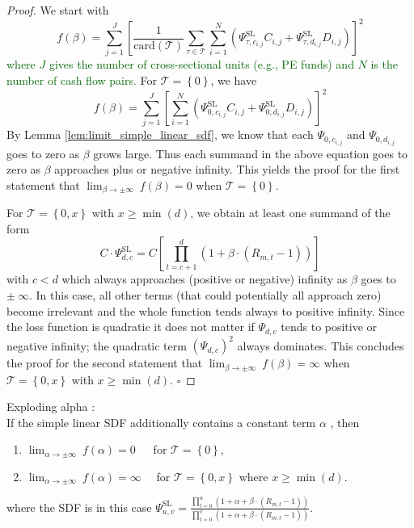 \begin{proof}
	We start with
	\[
	f(\beta) = \sum_{j=1}^J \left[
	\frac{1}{\mathrm{card}(\mathcal{T})} \sum_{\tau \in \mathcal{T}} 
	\sum_{i=1}^N \left( \Psi_{\tau, c_{i,j}}^{\mathrm{SL}} C_{i,j} + \Psi_{\tau,d_{i,j}}^{\mathrm{SL}} D_{i,j} \right)
	\right]^2
	\]
	\textcolor{darkgreen}{where $J$ gives the number of cross-sectional units (e.g., PE funds) and $N$ is the number of cash flow pairs.}
	For $\mathcal{T} = \left\{ 0 \right\}$, we have
	\[
	f(\beta) = 
	\sum_{j=1}^J \left[
	\sum_{i=1}^N \left( \Psi_{0, c_{i,j}}^{\mathrm{SL}} C_{i,j} + \Psi_{0,d_{i,j}}^{\mathrm{SL}} D_{i,j} \right)
	\right]^2
	\]
	By Lemma \ref{lem:limit_simple_linear_sdf}, we know that each $\Psi_{0, c_{i,j}}$ and $\Psi_{0, d_{i,j}}$ goes to zero as $\beta$ grows large.
	Thus each summand in the above equation goes to zero as $\beta$ approaches plus or negative infinity.
	This yields the proof for the first statement that $\lim_{\beta \to \pm \infty} \ f(\beta) = 0$ when $\mathcal{T} = \left\{ 0 \right\}$.
	
	For $\mathcal{T} = \left\{ 0, x \right\}$ with $x \geq \min (d)$, we obtain at least one summand of the form
	\[
	C \cdot \Psi_{d,c}^{\mathrm{SL}} = 
	C \left[ \prod_{t = c+1}^{d} \left( 1 + \beta \cdot \left( R_{m,t} - 1 \right) \right) \right]
	\]
	with $c < d$ which always approaches (positive or negative) infinity as $\beta$ goes to $\pm \ \infty$.
	In this case, all other terms (that could potentially all approach zero) become irrelevant and the whole function tends always to positive infinity.
	Since the loss function is quadratic it does not matter if $\Psi_{d,c}$ tends to positive or negative infinity; the quadratic term $\left( \Psi_{d,c} \right)^2$ always dominates.
	This concludes the proof for the second statement that $ \lim_{\beta \to \pm \infty} \ f(\beta) = \infty$ when $\mathcal{T} = \left\{ 0, x \right\}$ with $x \geq \min (d) $.
	$\square$
\end{proof}


\begin{corollary}
	\label{coro:exploding_alpha}
	Exploding alpha \cite[Footnote 8]{DLP12}: \\
	If the simple linear SDF additionally contains a constant term $\alpha$ , then
	\begin{enumerate}
		\item $	\lim_{\alpha \to \pm \infty} \ f(\alpha) = 0 \quad \ $ for $\mathcal{T} = \left\{ 0 \right\}$,
		\item $	\lim_{\alpha \to \pm \infty} \ f(\alpha) = \infty \quad$ for $\mathcal{T} = \left\{ 0, x \right\}$ where $x \geq \min (d) $.
	\end{enumerate}
	where the SDF is in this case $	\Psi_{u,v}^{\mathrm{SL}} = 
	\frac{\prod_{t=0}^{u} \left( 1 + \alpha +  \beta \cdot \left( R_{m,t} - 1\right)  \right)}{\prod_{t=0}^{v} \left( 1 + \alpha + \beta \cdot \left( R_{m,t} - 1\right)  \right)}$.
\end{corollary}


